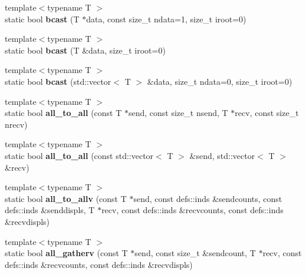 \begin{DoxyCompactItemize}
\item 
{\footnotesize template$<$typename T $>$ }\\static bool {\bfseries bcast} (T $\ast$data, const size\+\_\+t ndata=1, size\+\_\+t iroot=0)\hypertarget{structmpi_ab723a76539cce8aef7cbc5dc0135202e}{}\label{structmpi_ab723a76539cce8aef7cbc5dc0135202e}

\item 
{\footnotesize template$<$typename T $>$ }\\static bool {\bfseries bcast} (T \&data, size\+\_\+t iroot=0)\hypertarget{structmpi_abce137a2bf43d2216447cfefce43813f}{}\label{structmpi_abce137a2bf43d2216447cfefce43813f}

\item 
{\footnotesize template$<$typename T $>$ }\\static bool {\bfseries bcast} (std\+::vector$<$ T $>$ \&data, size\+\_\+t ndata=0, size\+\_\+t iroot=0)\hypertarget{structmpi_ad6917627733501d3bd9baf7444a59622}{}\label{structmpi_ad6917627733501d3bd9baf7444a59622}

\item 
{\footnotesize template$<$typename T $>$ }\\static bool {\bfseries all\+\_\+to\+\_\+all} (const T $\ast$send, const size\+\_\+t nsend, T $\ast$recv, const size\+\_\+t nrecv)\hypertarget{structmpi_ad6ee2131285f4d0bbb8f263e3845ba67}{}\label{structmpi_ad6ee2131285f4d0bbb8f263e3845ba67}

\item 
{\footnotesize template$<$typename T $>$ }\\static bool {\bfseries all\+\_\+to\+\_\+all} (const std\+::vector$<$ T $>$ \&send, std\+::vector$<$ T $>$ \&recv)\hypertarget{structmpi_a19f2bbd0ba6f91228e40251f410fdbfe}{}\label{structmpi_a19f2bbd0ba6f91228e40251f410fdbfe}

\item 
{\footnotesize template$<$typename T $>$ }\\static bool {\bfseries all\+\_\+to\+\_\+allv} (const T $\ast$send, const defs\+::inds \&sendcounts, const defs\+::inds \&senddispls, T $\ast$recv, const defs\+::inds \&recvcounts, const defs\+::inds \&recvdispls)\hypertarget{structmpi_aacd625bb0f764f7d67da1aaa61f28f20}{}\label{structmpi_aacd625bb0f764f7d67da1aaa61f28f20}

\item 
{\footnotesize template$<$typename T $>$ }\\static bool {\bfseries all\+\_\+gatherv} (const T $\ast$send, const size\+\_\+t \&sendcount, T $\ast$recv, const defs\+::inds \&recvcounts, const defs\+::inds \&recvdispls)\hypertarget{structmpi_a21b91ca1d7d0f2ca2b8dc6229554ad64}{}\label{structmpi_a21b91ca1d7d0f2ca2b8dc6229554ad64}


\end{DoxyCompactItemize}
